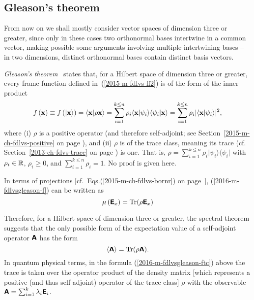 \subsection{Gleason's theorem}
\label{Gleasontheorem}

From now on we shall mostly consider vector spaces of dimension three or greater,
since only in these cases two  orthonormal bases intertwine in a common vector, making possible
some arguments involving multiple intertwining bases  -- in two dimensions,
distinct orthonormal bases contain distinct basis vectors.


{\em Gleason's theorem}~\cite[-00mm]{Gleason,r:dvur-93,pitowsky:218,rich-bridge,peres,hamhalter-book}
states that,
for a Hilbert space of dimension three or greater,
every frame function defined in~(\ref{2015-m-fdlvs-ff2})
is of the form  of the inner product
\begin{equation}
f \left(   {\bf x}   \right)
\equiv
f \left( \vert {\bf x} \rangle \right)
=
\langle {\bf x}  \vert \rho {\bf x} \rangle
=
\sum_{i=1}^{k\le n} \rho_i
\langle {\bf x}  \vert \psi_i\rangle \langle \psi_i \vert {\bf x} \rangle
=
\sum_{i=1}^{k\le n} \rho_i
\vert \langle {\bf x}  \vert \psi_i\rangle \vert^2
,
\label{2016-m-fdlvsgleason-f}
\end{equation}
where
(i) $\rho $
is a positive operator (and therefore self-adjoint;
see Section~\ref{2015-m-ch-fdlvs-positive} on page \pageref{2015-m-ch-fdlvs-positive}),
and
(ii) $\rho $ is
of the trace class,
meaning its trace (cf. Section~\ref{2013-ch-fdvs-trace} on page \pageref{2013-ch-fdvs-trace}) is one.
That is, $\rho=
\sum_{i=1}^{k\le n} \rho_i \vert \psi_i \rangle \langle \psi_i \vert$
with $\rho_i \in {\Bbb R}$, $\rho_i \ge 0$, and $\sum_{i=1}^{k\le n} \rho_i =1$.
No proof is given here.

In terms of projections [cf.~Eqs.(\ref{2015-m-ch-fdlvs-bornr}) on page~\pageref{2015-m-ch-fdlvs-bornr}],
(\ref{2016-m-fdlvsgleason-f}) can be written as
\begin{equation}
\mu \left( \textsf{\textbf{E}}_x \right)
=
{\rm Tr}( \rho  \textsf{\textbf{E}}_x )
\label{2016-m-fdlvsgleason-fproj}
\end{equation}



Therefore, for a Hilbert space of dimension three or greater, the  spectral theorem suggests that
the only possible form of the  expectation value
of a self-adjoint operator  $\textsf{\textbf{A}}$
has the form
\begin{equation}
\langle
\textsf{\textbf{A}}
\rangle
=
\textrm{Tr}({  \rho} \textsf{\textbf{A}}).
\label{2016-m-fdlvsgleason-ftc}
\end{equation}
In quantum physical terms, in the formula (\ref{2016-m-fdlvsgleason-ftc}) above
the trace is taken over
the operator product of the  density matrix [which represents a positive (and thus self-adjoint) operator of the trace class]
${  \rho}$
with the observable $\textsf{\textbf{A}}=\sum_{i=1}^k \lambda_i \textsf{\textbf{E}}_i $.

